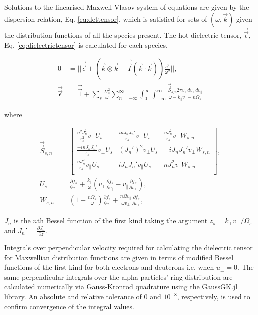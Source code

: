 \documentclass[12pt]{iopart}
\begin{document}
Solutions to the linearised Maxwell-Vlasov system of equations are given by the
dispersion relation, Eq. \ref{eq:dettensor}, which is satisfied for sets of
$(\omega,\vec{k})$ given the distribution functions of all the species present.
The hot dielectric tensor\cite{Stix}, $\vec{\vec{\epsilon}}$, Eq. \ref{eq:dielectrictensor} is calculated for each species.

\begin{align}
    0 &= ||\vec{\vec{\epsilon}} + \left(\vec{k} \otimes \vec{k} - \vec{\vec{I}}(\vec{k}\cdot\vec{k})\right) \frac{c^2}{\omega^2}||,\label{eq:dettensor}\\
    \vec{\vec{\epsilon}} &= \vec{\vec{1}} + \sum_s \frac{\Pi_s^2}{\omega}\sum_{n=-\infty}^{\infty}
    \int_0^{\infty}
    \int_{-\infty}^{\infty}\frac{\vec{\vec{S}}_{s,n} 2\pi v_\perp dv_\perp dv_\parallel}{\omega - k_\parallel v_\parallel - n \Omega_s}
    \label{eq:dielectrictensor}
\end{align}

\noindent where

\begin{align}
\vec{\vec{S}}_{s,n} &=
\begin{bmatrix}
\frac{n^2J_n^2}{z_s^2}v_\perp U_s & \frac{inJ_nJ_n'}{z_s}v_\perp U_s & \frac{n
  J_n^2}{z_s} v_\perp W_{s,n} \\
\frac{-inJ_nJ_n'}{z_s}v_\perp U_s & (J_n')^2 v_\perp U_s & -iJ_n J_n' v_\perp
  W_{s,n} \\
\frac{nJ_n^2}{z_s}v_\parallel U_s & iJ_nJ_n'v_\parallel U_s & n J_n^2
  v_\parallel W_{s,n} \\
\end{bmatrix}\label{eq:stenor},\\
U_s &= \frac{\partial f_s}{\partial v_\perp} + \frac{k_\parallel}{\omega}  \left(v_\perp \frac{\partial f_s}{\partial v_\parallel} - v_\parallel \frac{\partial f_s}{\partial v_\perp}\right)\label{eq:uterm},\\
  W_{s,n} &=\left(1- \frac{n\Omega_s}{\omega}\right)\frac{\partial f_s}{\partial v_\parallel} + \frac{n\Omega v_\parallel}{\omega v_\perp}\frac{\partial f_s}{\partial v_\perp}\label{eq:wterm},
\end{align}

\noindent $J_n$ is the $n$th Bessel function of the first kind taking the
argument $z_s=k_\perp v_\perp / \Omega_s$ and $J_n'=\frac{\partial J_n}{\partial z}$.

Integrals over perpendicular velocity required for calculating the
dielectric tensor for Maxwellian distribution functions are given in terms of
modified Bessel functions of the first kind\cite{Stix} for both electrons and
deuterons i.e. when $u_\perp =0$. The same perpendicular integrals over the
alpha-particles' ring distribution are calculated numerically via
Gauss-Kronrod\cite{Kronrod1965} quadrature using the GaussGK.jl\cite{QuadGK}
library. An absolute and relative tolerance of $0$ and $10^{-8}$, respectively,
is used to confirm convergence of the integral values.
\end{document}
